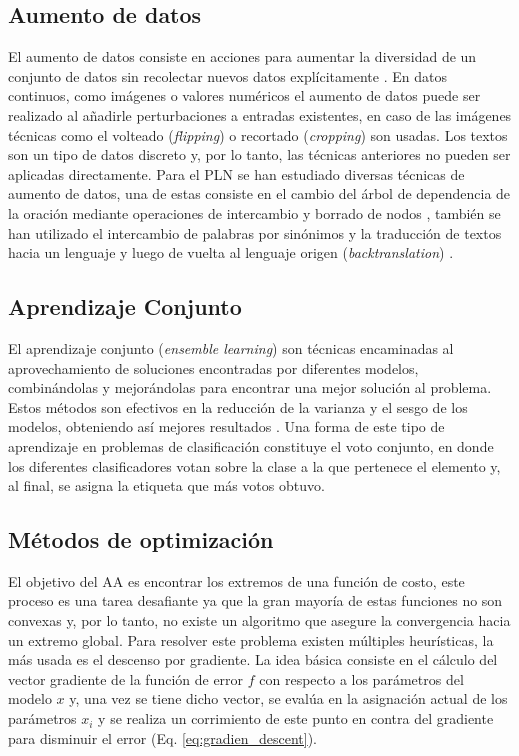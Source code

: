 \documentclass[a4paper,11pt,twocolumn,twoside]{article}
\begin{document}
\subsection{Aumento de datos}

El aumento de datos consiste en acciones para aumentar la diversidad de un conjunto de datos sin recolectar
nuevos datos explícitamente \cite{feng2021data}. En datos continuos, como imágenes o valores numéricos el 
aumento de datos puede ser realizado al añadirle perturbaciones a entradas existentes, en caso de las imágenes 
técnicas como el volteado (\textit{flipping}) o recortado (\textit{cropping}) son usadas. Los textos son un tipo 
de datos discreto y, por lo tanto, las técnicas anteriores no pueden ser aplicadas directamente. Para el PLN
se han estudiado diversas técnicas de aumento de datos, una de estas consiste en el cambio del árbol de 
dependencia de la oración mediante operaciones de intercambio y borrado de nodos \cite{csahin2019data}, también se han utilizado 
el intercambio de palabras por sinónimos \cite{dai2020analysis} y la traducción de textos hacia un lenguaje y luego 
de vuelta al lenguaje origen (\textit{backtranslation}) \cite{sennrich2015improving}. 

\subsection{Aprendizaje Conjunto}

El aprendizaje conjunto (\textit{ensemble learning}) son técnicas encaminadas al aprovechamiento
de soluciones encontradas por diferentes modelos, combinándolas y mejorándolas para encontrar una mejor solución 
al problema. Estos métodos son efectivos en la reducción de la varianza y el sesgo de los modelos, obteniendo así
mejores resultados \cite{dietterich2002ensemble}. Una forma de este tipo de aprendizaje en problemas de 
clasificación constituye el voto conjunto, en donde los diferentes clasificadores votan sobre la clase a la que 
pertenece el elemento y, al final, se asigna la etiqueta que más votos obtuvo.

\subsection{Métodos de optimización}

El objetivo del AA es encontrar los extremos de una función de costo, este proceso es una tarea 
desafiante ya que la gran mayoría de estas funciones no son convexas y, por lo tanto, no existe un algoritmo
que asegure la convergencia hacia un extremo global. Para resolver este problema existen múltiples heurísticas,
la más usada es el descenso por gradiente. La idea básica consiste 
en el cálculo del vector gradiente de la función de error $f$ con respecto a los parámetros del modelo $x$ y, una vez se 
tiene dicho vector, se evalúa en la asignación actual de los parámetros $x_i$ y se realiza un corrimiento de este punto 
en contra del gradiente para disminuir el error (Eq. \ref{eq:gradien_descent}).
\end{document}
